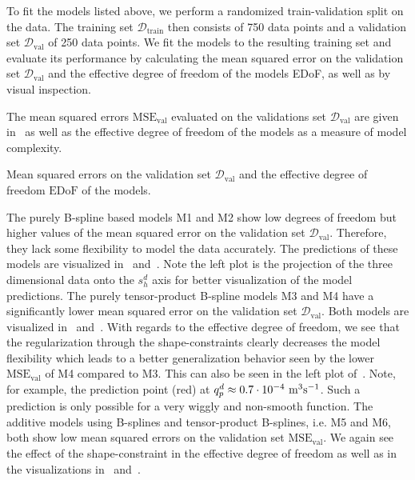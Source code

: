 To fit the models listed above, we perform a randomized train-validation split on the data. The training set $\mathcal{D}_{\text{train}}$ then consists of 750 data points and a validation set $\mathcal{D}_{\text{val}}$ of 250 data points. We fit the models to the resulting training set and evaluate its performance by calculating the mean squared error on the validation set $\mathcal{D}_{\text{val}}$ and the effective degree of freedom of the models EDoF, as well as by visual inspection.


The mean squared errors $\mathrm{MSE}_{\mathrm{val}}$ evaluated on the validations set $\mathcal{D}_{\text{val}}$ are given in~ as well as the effective degree of freedom of the models as a measure of model complexity. 

\begin{table}[H]
	\begin{center}
	\end{center}
	\caption{Mean squared errors on the validation set $\mathcal{D}_{\text{val}}$ and the effective degree of freedom $\text{EDoF}$ of the models.}
	\label{tab:bosch-mse-val}
\end{table}

The purely B-spline based models M1 and M2 show low degrees of freedom but higher values of the mean squared error on the validation set $\mathcal{D}_{\text{val}}$. Therefore, they lack some flexibility to model the data accurately. The predictions of these models are visualized in~ and~. Note the left plot is the projection of the three dimensional data onto the $s_h^d$ axis for better visualization of the model predictions. The purely tensor-product B-spline models M3 and M4 have a significantly lower mean squared error on the validation set $\mathcal{D}_{\text{val}}$. Both models are visualized in~ and~. With regards to the effective degree of freedom, we see that the regularization through the shape-constraints clearly decreases the model flexibility which leads to a better generalization behavior seen by the lower $\text{MSE}_{\text{val}}$ of M4 compared to M3. This can also be seen in the left plot of~. Note, for example, the prediction point (red) at $q_p^d \approx 0.7 \cdot 10^{-4} \ \si{\cubic m s^{-1}}$. Such a prediction is only possible for a very wiggly and non-smooth function. The additive models using B-splines and tensor-product B-splines, i.e. M5 and M6, both show low mean squared errors on the validation set $\text{MSE}_{\text{val}}$. We again see the effect of the shape-constraint in the effective degree of freedom as well as in the visualizations in~ and~. 

